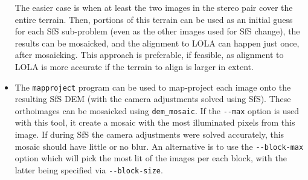 \begin{itemize}{}
The easier case is when at least the two images in the stereo pair
cover the entire terrain. Then, portions of this terrain can be used
as an initial guess for each SfS sub-problem (even as the other images
used for SfS change), the results can be mosaicked, and the alignment
to LOLA can happen just once, after mosaicking. This approach is
preferable, if feasible, as alignment to LOLA is more accurate if the
terrain to align is larger in extent.

\item The \texttt{mapproject} program can be used to map-project each image
onto the resulting SfS DEM (with the camera adjustments solved using
SfS). These orthoimages can be mosaicked using \texttt{dem\_mosaic}. If the
\texttt{-\/-max} option is used with this tool, it create a mosaic with
the most illuminated pixels from this image. If during SfS the camera
adjustments were solved accurately, this mosaic should have little or no
blur. An alternative is to use the \texttt{-\/-block-max} option
which will pick the most lit of the images per each block, with the latter
being specified via \texttt{-\/-block-size}. 
\end{itemize}

